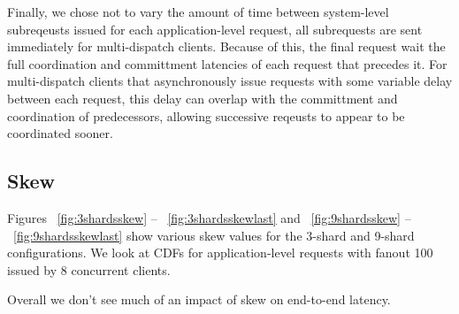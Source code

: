 Finally, we chose not to vary the amount of time between system-level subreqeusts issued for each application-level request, all subrequests are sent immediately for multi-dispatch clients. Because of this, the final request wait the full coordination and committment latencies of each request that precedes it. For multi-dispatch clients that asynchronously issue requests with some variable delay between each request, this delay can overlap with the committment and coordination of predecessors, allowing successive reqeusts to appear to be coordinated sooner.

\subsection{Skew}
Figures ~\ref{fig:3shardsskew} -- ~\ref{fig:3shardsskewlast} and ~\ref{fig:9shardsskew} -- ~\ref{fig:9shardsskewlast} show various skew values for the 3-shard and 9-shard configurations. We look at CDFs for application-level requests with fanout 100 issued by 8 concurrent clients. 

Overall we don't see much of an impact of skew on end-to-end latency.

